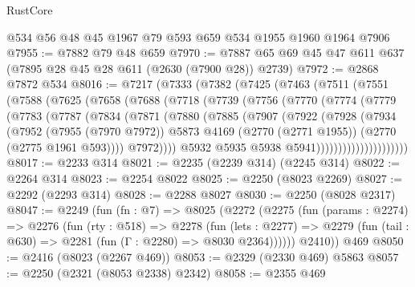 \begin{lexlean}{RustCore}
\begin{coremodule}
    @534
    @56
    @48
    @45
    @1967
    @79
    @593
    @659
    @534
    @1955
    @1960
    @1964
    @7906
@7955 := @7882 @79 @48 @659
@7970 := @7887 @65 @69 @45 @47 @611 @637 (@7895 @28 @45 @28 @611 (@2630 (@7900 @28)) @2739)
@7972 := @2868 @7872 @534
@8016 := @7217
    (@7333
      (@7382
        (@7425
          (@7463
            (@7511
              (@7551
                (@7588
                  (@7625
                    (@7658
                      (@7688
                        (@7718
                          (@7739
                            (@7756
                              (@7770
                                (@7774
                                  (@7779
                                    (@7783
                                      (@7787
                                        (@7834
                                          (@7871
                                            (@7880
                                              (@7885
                                                (@7907
                                                  (@7922
                                                    (@7928
                                                      (@7934
                                                        (@7952
                                                          (@7955 (@7970 @7972))
                                                          @5873
                                                          @4169
                                                          (@2770 (@2771 @1955))
                                                          (@2770 (@2775 @1961 @593))))
                                                      @7972))))
                                              @5932
                                              @5935
                                              @5938
                                              @5941)))))))))))))))))))))
@8017 := @2233 @314
@8021 := @2235 (@2239 @314) (@2245 @314)
@8022 := @2264 @314
@8023 := @2254 @8022
@8025 := @2250 (@8023 @2269)
@8027 := @2292 (@2293 @314)
@8028 := @2288 @8027
@8030 := @2250 (@8028 @2317)
@8047 := @2249
    (fun (fn : @7) =>
    @8025
      (@2272
        (@2275
          (fun (params : @2274) =>
          @2276
            (fun (rty : @518) =>
            @2278
              (fun (lets : @2277) =>
              @2279 (fun (tail : @630) => @2281 (fun (Γ : @2280) => @8030 @2364))))))
        @2410))
    @469
@8050 := @2416 (@8023 (@2267 @469))
@8053 := @2329 (@2330 @469) @5863
@8057 := @2250 (@2321 (@8053 @2338) @2342)
@8058 := @2355 @469

\end{coremodule}
\end{lexlean}
